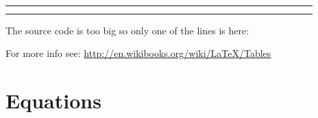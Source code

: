 \documentclass[a4paper,12pt]{article}
\begin{document}
\begin{table}[H]
\begin{center}
{\begin{tabular}{|c|c|c|c|c|c|c|c|c|c|c|c|c|c|c|c|c|c|c|c|c|c|c|c|c|c|c|c|c|c|c|c|}
\cellcolor{white} & 	\cellcolor{white} & 	\cellcolor{white} & 	\cellcolor{ITBlue} & 	\cellcolor{ITBlue} & 	\cellcolor{ITBlue} & 	\cellcolor{ITBlue} & 	\cellcolor{ITBlue} & 	\cellcolor{ITBlue} & 	\cellcolor{ITBlue} & 	\cellcolor{ITBlue} & 	\cellcolor{ITBlue} & 	\cellcolor{ITBlue} & 	\cellcolor{white} & 	\cellcolor{white} & 	\cellcolor{white} & 	\cellcolor{white} & 	\cellcolor{white} & 	\cellcolor{ITBlue} & 	\cellcolor{ITBlue} & 	\cellcolor{ITBlue} & 	\cellcolor{ITBlue} & 	\cellcolor{ITBlue} & 	\cellcolor{ITBlue} & 	\cellcolor{ITBlue} & 	\cellcolor{ITBlue} & 	\cellcolor{ITBlue} & 	\cellcolor{white} & 	\cellcolor{white} & 	\cellcolor{white} & 	\cellcolor{white} & 	\\	\hline
\cellcolor{white} & 	\cellcolor{white} & 	\cellcolor{white} & 	\cellcolor{white} & 	\cellcolor{white} & 	\cellcolor{white} & 	\cellcolor{white} & 	\cellcolor{white} & 	\cellcolor{white} & 	\cellcolor{white} & 	\cellcolor{white} & 	\cellcolor{white} & 	\cellcolor{white} & 	\cellcolor{white} & 	\cellcolor{white} & 	\cellcolor{white} & 	\cellcolor{white} & 	\cellcolor{white} & 	\cellcolor{white} & 	\cellcolor{white} & 	\cellcolor{white} & 	\cellcolor{white} & 	\cellcolor{white} & 	\cellcolor{white} & 	\cellcolor{white} & 	\cellcolor{white} & 	\cellcolor{white} & 	\cellcolor{white} & 	\cellcolor{white} & 	\cellcolor{white} & 	\cellcolor{white} & 	\\	\hline
\cellcolor{white} & 	\cellcolor{white} & 	\cellcolor{white} & 	\cellcolor{white} & 	\cellcolor{white} & 	\cellcolor{white} & 	\cellcolor{white} & 	\cellcolor{white} & 	\cellcolor{white} & 	\cellcolor{white} & 	\cellcolor{white} & 	\cellcolor{white} & 	\cellcolor{white} & 	\cellcolor{white} & 	\cellcolor{white} & 	\cellcolor{white} & 	\cellcolor{white} & 	\cellcolor{white} & 	\cellcolor{white} & 	\cellcolor{white} & 	\cellcolor{white} & 	\cellcolor{white} & 	\cellcolor{white} & 	\cellcolor{white} & 	\cellcolor{white} & 	\cellcolor{white} & 	\cellcolor{white} & 	\cellcolor{white} & 	\cellcolor{white} & 	\cellcolor{white} & 	\cellcolor{white} & 	\\	\hline
\end{tabular}
}
\end{center}
\end{table}
The source code is too big so only one of the lines is here:


For more info see: \url{http://en.wikibooks.org/wiki/LaTeX/Tables} 

\section{Equations}
\label{sec:equations}
\end{document}
